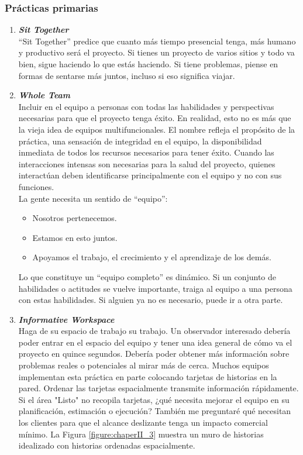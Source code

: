 \begin{spacing}{1.5}
		\subsubsection{Pr\'{a}cticas primarias}
			\begin{enumerate}
				\item \textit{\textbf{Sit Together}}\\
				``Sit Together'' predice que cuanto más tiempo presencial tenga, más humano y productivo será el proyecto. Si tienes un proyecto de varios sitios y todo va bien, sigue haciendo lo que estás haciendo. Si tiene problemas, piense en formas de sentarse más juntos, incluso si eso significa viajar.\\
				\item \textit{\textbf{Whole Team}}\\
				Incluir en el equipo a personas con todas las habilidades y perspectivas necesarias para que el proyecto tenga éxito. En realidad, esto no es más que la vieja idea de equipos multifuncionales. El nombre refleja el propósito de la práctica, una sensación de integridad en el equipo, la disponibilidad inmediata de todos los recursos necesarios para tener éxito. Cuando las interacciones intensas son necesarias para la salud del proyecto, quienes interactúan deben identificarse principalmente con el equipo y no con sus funciones.\\
				La gente necesita un sentido de ``equipo'':
				\begin{itemize}
					\item Nosotros pertenecemos.
					\item Estamos en esto juntos.
					\item Apoyamos el trabajo, el crecimiento y el aprendizaje de los demás.
				\end{itemize}
				Lo que constituye un “equipo completo” es dinámico. Si un conjunto de habilidades o actitudes se vuelve importante, traiga al equipo a una persona con estas habilidades. Si alguien ya no es necesario, puede ir a otra parte.
				\item \textit{\textbf{Informative Workspace}}\\
				Haga de su espacio de trabajo su trabajo. Un observador interesado debería poder entrar en el espacio del equipo y tener una idea general de cómo va el proyecto en quince segundos. Debería poder obtener más información sobre problemas reales o potenciales al mirar más de cerca. Muchos equipos implementan esta práctica en parte colocando tarjetas de historias en la pared. Ordenar las tarjetas espacialmente transmite información rápidamente. Si el área "Listo" no recopila tarjetas, ¿qué necesita mejorar el equipo en su planificación, estimación o ejecución? También me preguntaré qué necesitan los clientes para que el alcance deslizante tenga un impacto comercial mínimo. La Figura \ref{figure:chaperII_3} muestra un muro de historias idealizado con historias ordenadas espacialmente.

\end{enumerate}
\end{spacing}
